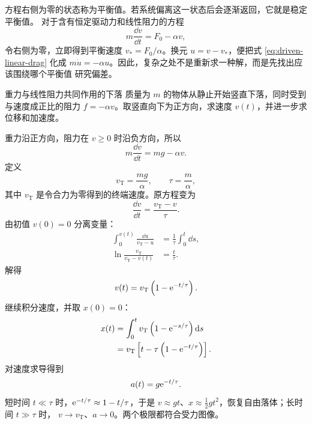\documentclass[UTF8,zihao=-4,oneside,openany]{ctexbook}
\begin{document}
方程右侧为零的状态称为平衡值。若系统偏离这一状态后会逐渐返回，它就是稳定平衡值。
对于含有恒定驱动力和线性阻力的方程
\begin{equation}
  m\frac{\dd v}{\dd t}=F_0-\alpha v,
  \label{eq:driven-linear-drag}
\end{equation}
令右侧为零，立即得到平衡速度 $v_*=F_0/\alpha$。换元
$u=v-v_*$，便把式 \eqref{eq:driven-linear-drag} 化成
$m\dot u=-\alpha u$。因此，复杂之处不是重新求一种解，而是先找出应该围绕哪个平衡值
研究偏差。

\begin{examplebox}{重力与线性阻力共同作用的下落}
质量为 $m$ 的物体从静止开始竖直下落，同时受到与速度成正比的阻力
$f=-\alpha v$。取竖直向下为正方向，求速度 $v(t)$，并进一步求位移和加速度。

\tcblower
重力沿正方向，阻力在 $v\ge0$ 时沿负方向，所以
\begin{equation}
  m\frac{\dd v}{\dd t}=mg-\alpha v.
  \label{eq:falling-linear-drag-ode}
\end{equation}
定义
\begin{equation}
  v_{\mathrm T}=\frac{mg}{\alpha},
  \qquad
  \tau=\frac{m}{\alpha},
  \label{eq:terminal-speed-and-time}
\end{equation}
其中 $v_{\mathrm T}$ 是令合力为零得到的终端速度。原方程变为
\[
  \frac{\dd v}{\dd t}=\frac{v_{\mathrm T}-v}{\tau}.
\]
由初值 $v(0)=0$ 分离变量：
\begin{align*}
  \int_0^{v(t)}\frac{\dd u}{v_{\mathrm T}-u}
  &=\frac1\tau\int_0^t\dd s,\\
  \ln\frac{v_{\mathrm T}}{v_{\mathrm T}-v(t)}
  &=\frac{t}{\tau}.
\end{align*}
解得
\begin{equation}
  v(t)=v_{\mathrm T}\left(1-\mathrm e^{-t/\tau}\right).
  \label{eq:falling-linear-drag-velocity}
\end{equation}
继续积分速度，并取 $x(0)=0$：
\begin{align}
  x(t)
  &=\int_0^t v_{\mathrm T}\left(1-\mathrm e^{-s/\tau}\right)\mathop{}\!\mathrm{d} s\notag\\
  &=v_{\mathrm T}\left[t-\tau\left(1-\mathrm e^{-t/\tau}\right)\right].
  \label{eq:falling-linear-drag-position}
\end{align}
对速度求导得到
\begin{equation}
  a(t)=g\mathrm e^{-t/\tau}.
  \label{eq:falling-linear-drag-acceleration}
\end{equation}
短时间 $t\ll\tau$ 时，$\mathrm e^{-t/\tau}\approx1-t/\tau$，于是
$v\approx gt$、$x\approx\frac12gt^2$，恢复自由落体；长时间 $t\gg\tau$ 时，
$v\to v_{\mathrm T}$、$a\to0$。两个极限都符合受力图像。
\end{examplebox}
\end{document}
